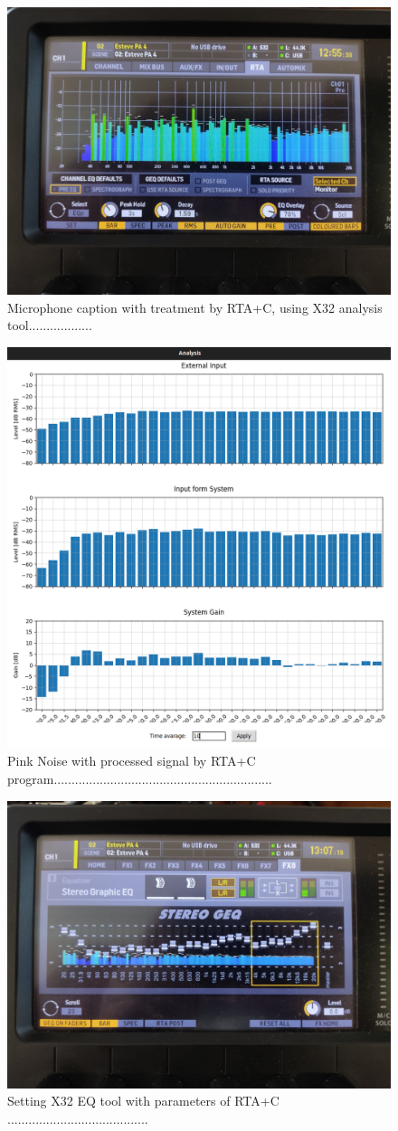 \begin{figure}[H]
	\centering
	\includegraphics[width=0.6
	\linewidth]{Figures/Coro_X32_treatedRTAc.jpeg}
	\caption{Microphone caption with treatment by RTA+C, using X32 analysis tool..................}
	\label{fig:Coro_X32_RTA+C}
\end{figure}

\begin{figure}[H]
	\centering
	\includegraphics[width=0.6
	\linewidth]{Figures/Coro_RTA+EQ_ON.png}
	\caption{Pink Noise with processed signal by RTA+C program..............................................................}
	\label{fig:Coro_RTA_RTA+C}
\end{figure}

\begin{figure}[H]
	\centering
	\includegraphics[width=0.6
	\linewidth]{Figures/Coro_X32_EQ.jpeg}
	\caption{Setting X32 EQ tool with parameters of RTA+C ........................................}
	\label{fig:Coro_X32_EQ}
\end{figure}


